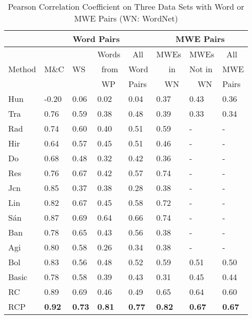 \begin{table}[th]
\centering \caption{Pearson Correlation Coefficient on Three Data Sets with Word or MWE Pairs (WN: WordNet)} \label{tab:benchmarkData}
\scriptsize{
\begin{tabular}{|p{23pt}|p{18pt}|p{15pt}|p{19pt}|p{16pt}||p{21pt}|p{23pt}|p{17pt}|}\hline
&   \multicolumn{4}{c||}{Word Pairs} &\multicolumn{3}{c|}{MWE Pairs}\\\hline
    &   & & Words &~All& MWEs &  MWEs &~All\\ %
Method  &M\&C &WS &~from  &  Word  &~~~in  &Not in  &  MWE \\
  && &~WP &  Pairs &~~WN & ~~WN & Pairs \\
\hline\hline %
Hun &-0.20 &0.06 &0.02&0.04 &0.37 &0.43&0.36\\ \hline %
Tra &0.76  &0.59 &0.38&0.48 &0.39 &0.33&0.34\\ \hline %
Rad&0.74   &0.60&0.40&0.51&0.59    &-&-\\ \hline %
Hir &0.64  &0.57&0.45&0.51&0.46    &-&-\\ \hline %
Do  &0.68  &0.48&0.32&0.42&0.36    &-&-\\ \hline %
Res&0.76   &0.67&0.42&0.57&0.74    &-&-\\ \hline %
Jcn&0.85   &0.37&0.38&0.28&0.38    &-&-\\ \hline %
Lin&0.82   &0.67&0.45&0.58&0.72    &-&-\\ \hline %
S\'{a}n&0.87   &0.69  &0.64&0.66&0.74  &-&-\\ \hline %
Ban&0.78   &0.65&0.43&0.56&0.38     &-&-\\ \hline %
Agi&0.80   &0.58&0.26&0.34&0.38     &-&-\\ \hline %
Bol&0.83   &0.56& 0.48&0.52&0.59 &0.51&0.50\\ \hline %
Basic&0.78 &0.58 &0.39&0.43&0.31    &0.45&0.44\\ \hline %
RC  &0.89  &0.69 &0.46&0.49&0.65    &0.64&0.60\\ \hline %
RCP&\textbf{0.92}&\textbf{0.73} &\textbf{0.81}&\textbf{0.77}&\textbf{0.82} &\textbf{0.67}&\textbf{0.67}\\ \hline %
\end{tabular}
}
\end{table}

